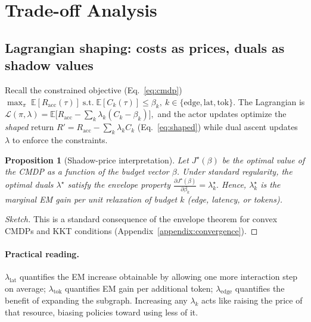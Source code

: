 \documentclass{article} %
\newtheorem{proposition}{Proposition}
\begin{document}



\newpage

\section{Trade-off Analysis }
\label{app:tradeoff}

\subsection{Lagrangian shaping: costs as prices, duals as shadow values}
\label{app:tradeoff:lagrangian}

Recall the constrained objective (Eq.~\ref{eq:cmdp})
\(
\max_\pi \;\mathbb{E}[R_{\mathrm{acc}}(\tau)] \;\text{s.t.}\;
\mathbb{E}[C_k(\tau)] \le \beta_k,\ k\!\in\!\{\text{edge},\text{lat},\text{tok}\}.
\)
The Lagrangian is
\(
\mathcal{L}(\pi,\lambda) = \mathbb{E}\big[R_{\mathrm{acc}} - \sum_k \lambda_k(C_k-\beta_k)\big],
\)
and the actor updates optimize the \emph{shaped} return $R' = R_{\mathrm{acc}} - \sum_k \lambda_k C_k$ (Eq.~\ref{eq:shaped}) while dual ascent updates $\lambda$ to enforce the constraints.

\begin{proposition}[Shadow-price interpretation]
\label{prop:shadow}
Let $J^\star(\beta)$ be the optimal value of the CMDP as a function of the budget vector $\beta$. Under standard regularity, the optimal duals $\lambda^\star$ satisfy the envelope property
\(
\frac{\partial J^\star(\beta)}{\partial \beta_k} = \lambda^\star_k.
\)
Hence, $\lambda^\star_k$ is the \emph{marginal EM gain per unit relaxation} of budget $k$ (edge, latency, or tokens).
\end{proposition}
\begin{proof}[Sketch]
This is a standard consequence of the envelope theorem for convex CMDPs and KKT conditions (Appendix~\ref{appendix:convergence}). \qedhere
\end{proof}

\paragraph{Practical reading.}
$\lambda_{\text{lat}}$ quantifies the EM increase obtainable by allowing one more interaction step on average; $\lambda_{\text{tok}}$ quantifies EM gain per additional token; $\lambda_{\text{edge}}$ quantifies the benefit of expanding the subgraph. Increasing any $\lambda_k$ acts like raising the price of that resource, biasing policies toward using less of it.
\end{document}
